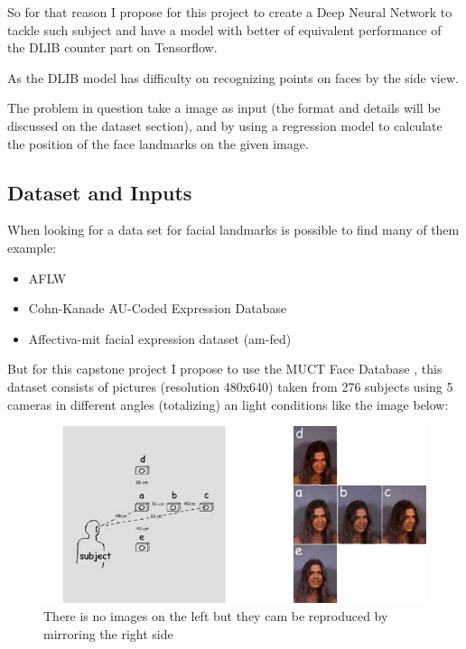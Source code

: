 \documentclass[11pt]{article}
\begin{document}
So for that reason I propose for this project to create a Deep Neural Network to
tackle such subject and have a model with better of equivalent performance of
the DLIB counter part on Tensorflow.

As the DLIB model has difficulty on recognizing points on faces by the side
view. 

The problem in question take a image as input (the format and details will be
discussed on the dataset section), and by using a regression model to
calculate the position of the face landmarks on the given image. 

\subsection{Dataset and Inputs}
\label{sec:org04b013a}

When looking for a data set for facial landmarks is possible to find many of
them example:

\begin{itemize}
\item AFLW \cite{sagonas2013300}
\item Cohn-Kanade AU-Coded Expression Database \cite{cohn1999cohn}
\item Affectiva-mit facial expression dataset (am-fed) \cite{mcduff2013affectiva}
\end{itemize}

But for this capstone project I propose to use the MUCT Face Database
\cite{Milborrow10}, this dataset consists of pictures (resolution 480x640) taken from 276 subjects
using 5 cameras in different angles (totalizing) an light conditions like the image below:

\begin{figure}[htbp]
\centering
\includegraphics[width=.9\linewidth]{./images/muct-views-lores.jpg}
\caption{There is no images on the left but they cam be reproduced by mirroring the right side}
\end{figure}
\end{document}
